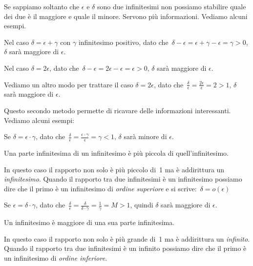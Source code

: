Se sappiamo soltanto che $\epsilon$ e $\delta$ sono due infinitesimi 
non possiamo stabilire quale dei due è il maggiore e quale il minore. 
Servono più informazioni. 
Vediamo alcuni esempi.

\begin{esempio}
Nel caso $\delta = \epsilon + \gamma$ con $\gamma$ infinitesimo positivo, 
dato che~$\delta-\epsilon=\epsilon+\gamma-\epsilon=\gamma>0$, 
$\delta$ sarà maggiore di $\epsilon$.
\end{esempio}

\begin{esempio}
Nel caso $\delta = 2\epsilon$, 
dato che~$\delta-\epsilon=2\epsilon-\epsilon=\epsilon>0$, 
$\delta$ sarà maggiore di $\epsilon$.
\end{esempio}

\begin{esempio}
Vediamo un altro modo per trattare il caso $\delta = 2\epsilon$, 
dato che~$\frac{\delta}{\epsilon}=\frac{2\epsilon}{\epsilon}=2>1$, 
$\delta$ sarà maggiore di $\epsilon$.
\end{esempio}

Questo secondo metodo permette di ricavare delle informazioni interessanti. 
Vediamo alcuni esempi:

\begin{esempio}
Se $\delta = \epsilon \cdot \gamma$, dato 
che~$\frac{\delta}{\epsilon}=\frac{\epsilon \cdot \gamma}{\epsilon}=\gamma<1$, 
$\delta$ sarà minore di $\epsilon$.

Una parte infinitesima di un infinitesimo è più piccola di quell'infinitesimo.
\end{esempio}

\begin{osservazione}
In questo caso il rapporto non solo è più piccolo di~1 ma è addirittura un 
\emph{infinitesimo}. 
Quando il rapporto tra due infinitesimi è un infinitesimo 
possiamo dire che il primo è un infinitesimo di \emph{ordine superiore} e si 
scrive:~$\delta=o(\epsilon)$
\end{osservazione}

\begin{esempio}
Se $\epsilon = \delta \cdot \gamma$, dato 
che~$\frac{\delta}{\epsilon}=\frac{\delta}{\delta \cdot \gamma}=
\frac{1}{\gamma}=M>1$, quindi
$\delta$ sarà maggiore di $\epsilon$.

Un infinitesimo è maggiore di una sua parte infinitesima.
\end{esempio}

\begin{osservazione}
In questo caso il rapporto non solo è più grande di~1 ma è addirittura un 
\emph{infinito}. 
Quando il rapporto tra due infinitesimi è un infinito 
possiamo dire che il primo è un infinitesimo di \emph{ordine inferiore}.
\end{osservazione}

